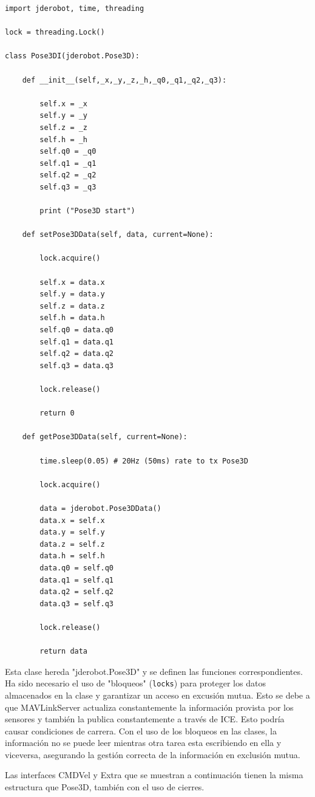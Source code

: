 \begin{lstlisting}[frame=single]
import jderobot, time, threading

lock = threading.Lock()

class Pose3DI(jderobot.Pose3D):

    def __init__(self,_x,_y,_z,_h,_q0,_q1,_q2,_q3):

        self.x = _x
        self.y = _y
        self.z = _z
        self.h = _h
        self.q0 = _q0
        self.q1 = _q1
        self.q2 = _q2
        self.q3 = _q3

        print ("Pose3D start")

    def setPose3DData(self, data, current=None):

        lock.acquire()

        self.x = data.x
        self.y = data.y
        self.z = data.z
        self.h = data.h
        self.q0 = data.q0
        self.q1 = data.q1
        self.q2 = data.q2
        self.q3 = data.q3

        lock.release()

        return 0

    def getPose3DData(self, current=None):

        time.sleep(0.05) # 20Hz (50ms) rate to tx Pose3D

        lock.acquire()

        data = jderobot.Pose3DData()
        data.x = self.x
        data.y = self.y
        data.z = self.z
        data.h = self.h
        data.q0 = self.q0
        data.q1 = self.q1
        data.q2 = self.q2
        data.q3 = self.q3

        lock.release()

        return data
\end{lstlisting}  

Esta clase hereda "jderobot.Pose3D" y se definen las funciones correspondientes. Ha sido necesario el uso de "bloqueos" (\texttt{locks}) para proteger los datos almacenados en la clase y garantizar un acceso en excusión mutua. Esto se debe a que MAVLinkServer actualiza constantemente la información provista por los sensores y también la publica constantemente a través de ICE. Esto podría causar condiciones de carrera. Con el uso de los bloqueos en las clases, la información no se puede leer mientras otra tarea esta escribiendo en ella y viceversa, asegurando la gestión correcta de la información en exclusión mutua.

Las interfaces CMDVel y Extra que se muestran a continuación tienen la misma estructura que Pose3D, también con el uso de cierres.

